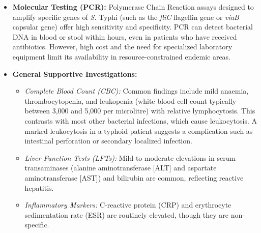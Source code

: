 \begin{itemize}
  \begin{itemize}
  \item \textit{Widal Test:} The Widal test measures agglutinating antibodies against the lipopolysaccharide somatic O antigen and flagellar H antigen of \textit{S.} Typhi. It is historically widely used but has significant limitations, including high rates of false-positive results (due to cross-reactivity with other Salmonella serovars or non-specific immune stimulation) and false-negative results (especially if performed too early in the disease). A single test is rarely diagnostic; a four-fold rise in antibody titres between acute and convalescent sera collected 10 to 14 days apart is required for confirmation, which limits its utility for acute clinical management.
  \item \textit{Rapid Diagnostic Tests (RDTs):} Commercial assays (such as Typhidot and Tubex) detect IgM and IgG antibodies directed against specific outer membrane proteins of \textit{S.} Typhi. IgM detection indicates acute infection. While they provide rapid results (within hours), their sensitivity and specificity are variable, and they cannot replace cultures for definitive diagnosis.
  \end{itemize}
\item \textbf{Molecular Testing (PCR):} Polymerase Chain Reaction assays designed to amplify specific genes of \textit{S.} Typhi (such as the \textit{fliC} flagellin gene or \textit{viaB} capsular gene) offer high sensitivity and specificity. PCR can detect bacterial DNA in blood or stool within hours, even in patients who have received antibiotics. However, high cost and the need for specialized laboratory equipment limit its availability in resource-constrained endemic areas.
\item \textbf{General Supportive Investigations:}
  \begin{itemize}
  \item \textit{Complete Blood Count (CBC):} Common findings include mild anaemia, thrombocytopenia, and leukopenia (white blood cell count typically between 3,000 and 5,000 per microlitre) with relative lymphocytosis. This contrasts with most other bacterial infections, which cause leukocytosis. A marked leukocytosis in a typhoid patient suggests a complication such as intestinal perforation or secondary localized infection.
  \item \textit{Liver Function Tests (LFTs):} Mild to moderate elevations in serum transaminases (alanine aminotransferase [ALT] and aspartate aminotransferase [AST]) and bilirubin are common, reflecting reactive hepatitis.
  \item \textit{Inflammatory Markers:} C-reactive protein (CRP) and erythrocyte sedimentation rate (ESR) are routinely elevated, though they are non-specific.
  \end{itemize}
\end{itemize}

